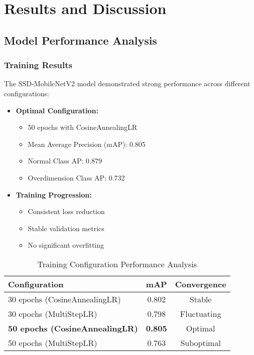 \section{Results and Discussion}
\label{sec:resultsanddiscussion}

\subsection{Model Performance Analysis}

\subsubsection{Training Results}
The SSD-MobileNetV2 model demonstrated strong performance across different configurations:

\begin{itemize}
  \item \textbf{Optimal Configuration:}
  \begin{itemize}
    \item 50 epochs with CosineAnnealingLR
    \item Mean Average Precision (mAP): 0.805
    \item Normal Class AP: 0.879
    \item Overdimension Class AP: 0.732
  \end{itemize}
  
  \item \textbf{Training Progression:}
  \begin{itemize}
    \item Consistent loss reduction
    \item Stable validation metrics
    \item No significant overfitting
  \end{itemize}
\end{itemize}

\begin{table}[htbp]
  \centering
  \caption{Training Configuration Performance Analysis}
  \label{tab:map_comparison}
  \begin{tabular}{|l|c|c|}
    \hline
    \rowcolor[HTML]{C0C0C0}
    \textbf{Configuration} & \textbf{mAP} & \textbf{Convergence} \\
    \hline
    30 epochs (CosineAnnealingLR) & 0.802 & Stable \\
    \hline
    30 epochs (MultiStepLR) & 0.798 & Fluctuating \\
    \hline
    \textbf{50 epochs (CosineAnnealingLR)} & \textbf{0.805} & Optimal \\
    \hline
    50 epochs (MultiStepLR) & 0.763 & Suboptimal \\
    \hline
  \end{tabular}
\end{table}

